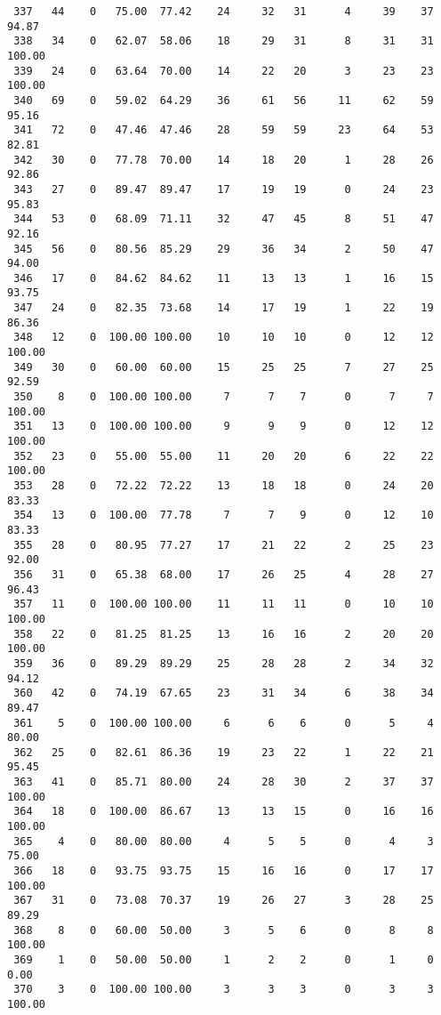 \begin{verbatim}
 337   44    0   75.00  77.42    24     32   31      4     39    37    94.87
 338   34    0   62.07  58.06    18     29   31      8     31    31   100.00
 339   24    0   63.64  70.00    14     22   20      3     23    23   100.00
 340   69    0   59.02  64.29    36     61   56     11     62    59    95.16
 341   72    0   47.46  47.46    28     59   59     23     64    53    82.81
 342   30    0   77.78  70.00    14     18   20      1     28    26    92.86
 343   27    0   89.47  89.47    17     19   19      0     24    23    95.83
 344   53    0   68.09  71.11    32     47   45      8     51    47    92.16
 345   56    0   80.56  85.29    29     36   34      2     50    47    94.00
 346   17    0   84.62  84.62    11     13   13      1     16    15    93.75
 347   24    0   82.35  73.68    14     17   19      1     22    19    86.36
 348   12    0  100.00 100.00    10     10   10      0     12    12   100.00
 349   30    0   60.00  60.00    15     25   25      7     27    25    92.59
 350    8    0  100.00 100.00     7      7    7      0      7     7   100.00
 351   13    0  100.00 100.00     9      9    9      0     12    12   100.00
 352   23    0   55.00  55.00    11     20   20      6     22    22   100.00
 353   28    0   72.22  72.22    13     18   18      0     24    20    83.33
 354   13    0  100.00  77.78     7      7    9      0     12    10    83.33
 355   28    0   80.95  77.27    17     21   22      2     25    23    92.00
 356   31    0   65.38  68.00    17     26   25      4     28    27    96.43
 357   11    0  100.00 100.00    11     11   11      0     10    10   100.00
 358   22    0   81.25  81.25    13     16   16      2     20    20   100.00
 359   36    0   89.29  89.29    25     28   28      2     34    32    94.12
 360   42    0   74.19  67.65    23     31   34      6     38    34    89.47
 361    5    0  100.00 100.00     6      6    6      0      5     4    80.00
 362   25    0   82.61  86.36    19     23   22      1     22    21    95.45
 363   41    0   85.71  80.00    24     28   30      2     37    37   100.00
 364   18    0  100.00  86.67    13     13   15      0     16    16   100.00
 365    4    0   80.00  80.00     4      5    5      0      4     3    75.00
 366   18    0   93.75  93.75    15     16   16      0     17    17   100.00
 367   31    0   73.08  70.37    19     26   27      3     28    25    89.29
 368    8    0   60.00  50.00     3      5    6      0      8     8   100.00
 369    1    0   50.00  50.00     1      2    2      0      1     0     0.00
 370    3    0  100.00 100.00     3      3    3      0      3     3   100.00

\end{verbatim}
